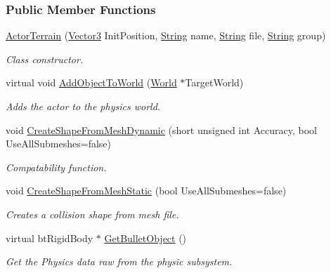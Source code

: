 \subsubsection*{Public Member Functions}
\begin{DoxyCompactItemize}
\item 
\hyperlink{classphys_1_1ActorTerrain_af0d3b88d5ee409c5451bb13a20254176}{ActorTerrain} (\hyperlink{classphys_1_1Vector3}{Vector3} InitPosition, \hyperlink{namespacephys_aa03900411993de7fbfec4789bc1d392e}{String} name, \hyperlink{namespacephys_aa03900411993de7fbfec4789bc1d392e}{String} file, \hyperlink{namespacephys_aa03900411993de7fbfec4789bc1d392e}{String} group)
\begin{DoxyCompactList}\small\item\em Class constructor. \item\end{DoxyCompactList}\item 
virtual void \hyperlink{classphys_1_1ActorTerrain_a890ee6f67fda30381bce9c949ae36566}{AddObjectToWorld} (\hyperlink{classphys_1_1World}{World} $\ast$TargetWorld)
\begin{DoxyCompactList}\small\item\em Adds the actor to the physics world. \item\end{DoxyCompactList}\item 
void \hyperlink{classphys_1_1ActorTerrain_a9fed38501411c0cf7a1e9f4f36af6ac7}{CreateShapeFromMeshDynamic} (short unsigned int Accuracy, bool UseAllSubmeshes=false)
\begin{DoxyCompactList}\small\item\em Compatability function. \item\end{DoxyCompactList}\item 
void \hyperlink{classphys_1_1ActorTerrain_aaed245d7af66230aaabb02a84e891bb0}{CreateShapeFromMeshStatic} (bool UseAllSubmeshes=false)
\begin{DoxyCompactList}\small\item\em Creates a collision shape from mesh file. \item\end{DoxyCompactList}\item 
virtual btRigidBody $\ast$ \hyperlink{classphys_1_1ActorTerrain_a1bed32f1b9afd1bd28c231b7505c267e}{GetBulletObject} ()
\begin{DoxyCompactList}\small\item\em Get the Physics data raw from the physic subsystem. \item\end{DoxyCompactList}\item 

\end{DoxyCompactItemize}

